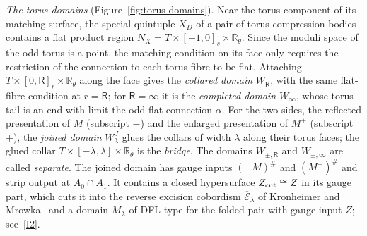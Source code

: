 \documentclass[11pt]{amsart}
\theoremstyle{definition}
\theoremstyle{remark}
\theoremstyle{plain}
\numberwithin{equation}{section}
\newcommand{\RR}{\mathbb R}
\begin{document}
\emph{The torus domains} (Figure~\ref{fig:torus-domains}). Near the torus component of its
matching surface, the special quintuple $X_D$ of a pair of torus compression bodies contains a flat
product region $N_X=T\times[-1,0]_s\times\RR_\theta$. Since the moduli space of the odd torus is a
point, the matching condition on its face only requires the restriction of the connection to each
torus fibre to be flat. Attaching $T\times[0,\mathsf R]_r\times\RR_\theta$ along the face gives the
\emph{collared domain} $W_{\mathsf R}$, with the same flat-fibre condition at $r=\mathsf R$; for
$\mathsf R=\infty$ it is the \emph{completed domain} $W_\infty$, whose torus tail is an end with limit
the odd flat connection $\alpha$. For the two sides, the reflected presentation of $M$ (subscript
$-$) and the enlarged presentation of $M^+$ (subscript $+$), the \emph{joined domain} $W^J_\lambda$
glues the collars of width $\lambda$ along their torus faces; the glued collar
$T\times[-\lambda,\lambda]\times\RR_\theta$ is the \emph{bridge}. The domains $W_{\pm,\mathsf R}$ and
$W_{\pm,\infty}$ are called \emph{separate}. The joined domain has gauge inputs $(-M)^\#$ and
$(M^+)^\#$ and strip output at $A_0\cap A_1$. It contains a closed hypersurface
$Z_{\rm cut}\cong Z$ in its gauge part, which cuts it into the reverse excision cobordism
$\overline{\mathcal E}_\lambda$ of Kronheimer and Mrowka~\cite[Section~5.3]{KM-unknot} and a domain
$M_\lambda$ of DFL type for the folded pair with gauge input $Z$; see~\ref{I2}.
\end{document}
